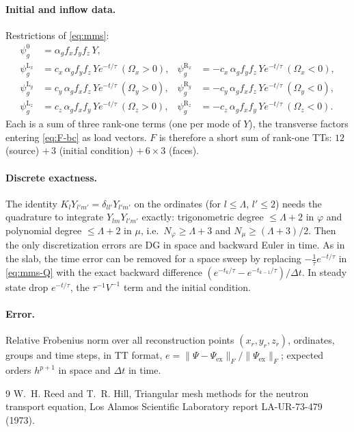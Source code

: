 \documentclass[11pt,a4paper]{article}
\newcommand{\Lmax}{\Lambda}
\begin{document}
\paragraph{Initial and inflow data.} Restrictions of \eqref{eq:mms}:
\begin{equation}
\begin{aligned}
\psi^0_g&=\alpha_gf_xf_yf_z\,Y,\\
\psi^{\mathrm L_x}_g&=c_x\,\alpha_gf_yf_z\,Ye^{-t/\tau}\ (\Omega_x>0), &
\psi^{\mathrm R_x}_g&=-c_x\,\alpha_gf_yf_z\,Ye^{-t/\tau}\ (\Omega_x<0),\\
\psi^{\mathrm L_y}_g&=c_y\,\alpha_gf_xf_z\,Ye^{-t/\tau}\ (\Omega_y>0), &
\psi^{\mathrm R_y}_g&=-c_y\,\alpha_gf_xf_z\,Ye^{-t/\tau}\ (\Omega_y<0),\\
\psi^{\mathrm L_z}_g&=c_z\,\alpha_gf_xf_y\,Ye^{-t/\tau}\ (\Omega_z>0), &
\psi^{\mathrm R_z}_g&=-c_z\,\alpha_gf_xf_y\,Ye^{-t/\tau}\ (\Omega_z<0).
\end{aligned}
\end{equation}
Each is a sum of three rank-one terms (one per mode of $Y$), the transverse factors entering \eqref{eq:F-bc} as load vectors. $F$ is therefore a short sum of rank-one TTs: $12$ (source) $+\,3$ (initial condition) $+\,6\times3$ (faces).

\paragraph{Discrete exactness.} The identity $K_lY_{l'm'}=\delta_{ll'}Y_{l'm'}$ on the ordinates (for $l\le\Lmax$, $l'\le2$) needs the quadrature to integrate $Y_{lm}Y_{l'm'}$ exactly: trigonometric degree $\le\Lmax+2$ in $\varphi$ and polynomial degree $\le\Lmax+2$ in $\mu$, i.e.\ $N_\varphi\ge\Lmax+3$ and $N_\mu\ge(\Lmax+3)/2$. Then the only discretization errors are DG in space and backward Euler in time. As in the slab, the time error can be removed for a space sweep by replacing $-\frac{1}{\tau}e^{-t/\tau}$ in \eqref{eq:mms-Q} with the exact backward difference $(e^{-t_k/\tau}-e^{-t_{k-1}/\tau})/\Delta t$. In steady state drop $e^{-t/\tau}$, the $\tau^{-1}V^{-1}$ term and the initial condition.

\paragraph{Error.} Relative Frobenius norm over all reconstruction points $(x_r,y_r,z_r)$, ordinates, groups and time steps, in TT format, $e=\|\Psi-\Psi_{\mathrm{ex}}\|_F/\|\Psi_{\mathrm{ex}}\|_F$; expected orders $h^{p+1}$ in space and $\Delta t$ in time.

\begin{thebibliography}{9}
 W.~H. Reed and T.~R. Hill, Triangular mesh methods for the neutron transport equation, Los Alamos Scientific Laboratory report LA-UR-73-479 (1973).
\end{thebibliography}
\end{document}
